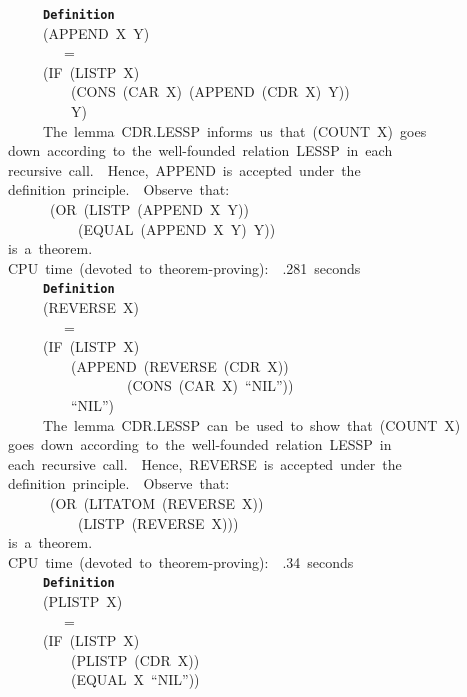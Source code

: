 \documentclass[11pt]{book}
\newenvironment{pubasis}{\begin{flushleft}\ttfamily\small}{\normalsize\rmfamily\end{flushleft}}
\newcommand{\axiomordefinition}[1]{\vspace{6pt}\texttt{\textbf{#1}}}
\begin{document}
\begin{pubasis}
~~~~~\axiomordefinition{Definition}\\
~~~~~(APPEND~X~Y)\\
~~~~~~~~=\\
~~~~~(IF~(LISTP~X)\\
~~~~~~~~~(CONS~(CAR~X)~(APPEND~(CDR~X)~Y))\\
~~~~~~~~~Y)\\

~~~~~The~lemma~CDR.LESSP~informs~us~that~(COUNT~X)~goes\\
down~according~to~the~well-founded~relation~LESSP~in~each\\
recursive~call.~~Hence,~APPEND~is~accepted~under~the\\
definition~principle.~~Observe~that:\\
~~~~~~(OR~(LISTP~(APPEND~X~Y))\\
~~~~~~~~~~(EQUAL~(APPEND~X~Y)~Y))\\
is~a~theorem.\\

CPU~time~(devoted~to~theorem-proving):~~.281~seconds\\

~~~~~\axiomordefinition{Definition}\\
~~~~~(REVERSE~X)\\
~~~~~~~~=\\
~~~~~(IF~(LISTP~X)\\
~~~~~~~~~(APPEND~(REVERSE~(CDR~X))\\
~~~~~~~~~~~~~~~~~(CONS~(CAR~X)~``NIL''))\\
~~~~~~~~~``NIL'')\\

~~~~~The~lemma~CDR.LESSP~can~be~used~to~show~that~(COUNT~X)\\
goes~down~according~to~the~well-founded~relation~LESSP~in\\
each~recursive~call.~~Hence,~REVERSE~is~accepted~under~the\\
definition~principle.~~Observe~that:\\
~~~~~~(OR~(LITATOM~(REVERSE~X))\\
~~~~~~~~~~(LISTP~(REVERSE~X)))\\
is~a~theorem.\\

CPU~time~(devoted~to~theorem-proving):~~.34~seconds\\

~~~~~\axiomordefinition{Definition}\\
~~~~~(PLISTP~X)\\
~~~~~~~~=\\
~~~~~(IF~(LISTP~X)\\
~~~~~~~~~(PLISTP~(CDR~X))\\
~~~~~~~~~(EQUAL~X~``NIL''))\\


\end{pubasis}
\end{document}
